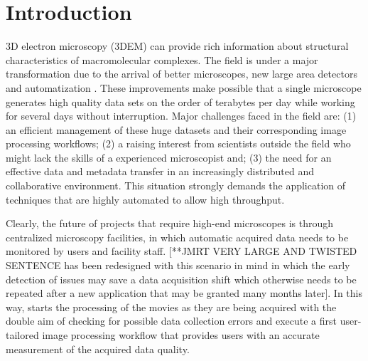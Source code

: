 
\section{Introduction}

3D electron microscopy (3DEM)  can provide rich information about structural characteristics of macromolecular complexes. The field is under a major transformation due to the arrival of better microscopes, new large area detectors and automatization \citep{kuhlbrandt2014a, Kuhlbrandt2014b}. These improvements make possible that a single microscope generates high quality data sets on the order of terabytes per day \citep{Saibil2015} while working for several days without interruption. Major challenges faced in the field are: (1) an efficient management of these huge datasets and their corresponding image processing workflows; (2) a raising interest from scientists outside the field who might lack the skills of a experienced microscopist and; (3) the need for an effective data and metadata transfer in an increasingly distributed and collaborative environment. This situation strongly demands the application of techniques that are highly automated to allow high throughput. 



Clearly, the future of projects that require high-end microscopes is through centralized microscopy facilities, in which automatic acquired data needs to be monitored by users and facility staff. [**JMRT VERY LARGE AND TWISTED SENTENCE \scipion has been redesigned with this scenario in mind in which the early detection of issues may save a data acquisition shift which otherwise needs to be repeated after a new application that may be granted many months later]. In this way, \scipion starts the processing of the movies as they are being acquired with the double aim of checking for possible data collection errors and execute a first user-tailored image processing workflow that provides users with an accurate measurement of the acquired data quality.

